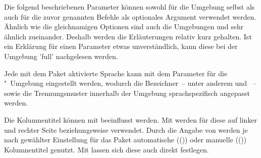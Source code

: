 \begin{DeclareEntity*}{}
\begin{DeclareEntity*}{}
\begin{DeclareEntity*}{}
\begin{Declaration}
\begin{Declaration}
\begin{Declaration}
\begin{Declaration}
\begin{Declaration}
\begin{Declaration}
\begin{Declaration}
\begin{Declaration}
\begin{Declaration}
\begin{Declaration}
\begin{Declaration}
Die folgend beschriebenen Parameter können sowohl für die Umgebung 
 selbst als auch für die zuvor genannten Befehle als 
optionales Argument verwendet werden. Ähnlich wie die gleichnamigen Optionen 
sind auch die Umgebungen  und  
sehr ähnlich zueinander. Deshalb werden die Erläuterungen relativ kurz 
gehalten. Ist ein Erklärung für einen Parameter etwas unverständlich, kann 
diese bei der Umgebung 'full' nachgelesen werden.

%
Jede mit dem Paket  aktivierte Sprache kann mit dem Parameter 
 für die 
"~Umgebung eingestellt werden, wodurch die 
Bezeichner~-- unter anderem  und ~-- 
sowie die Trennungsmuster innerhalb der Umgebung sprachspezifisch angepasst 
werden. 

%
%
Die Kolumnentitel können mit  
beeinflusst werden. Mit  werden für diese auf linker und rechter Seite  
beziehungsweise  verwendet. Durch die Angabe von
werden je nach gewählter Einstellung für das Paket  
automatische (()) oder manuelle 
(()) Kolumnentitel genutzt. Mit 
 lassen sich diese auch direkt festlegen.


\end{Declaration}
\end{Declaration}
\end{Declaration}
\end{Declaration}
\end{Declaration}
\end{Declaration}
\end{Declaration}
\end{Declaration}
\end{Declaration}
\end{Declaration}
\end{Declaration}
\end{DeclareEntity*}
\end{DeclareEntity*}
\end{DeclareEntity*}
